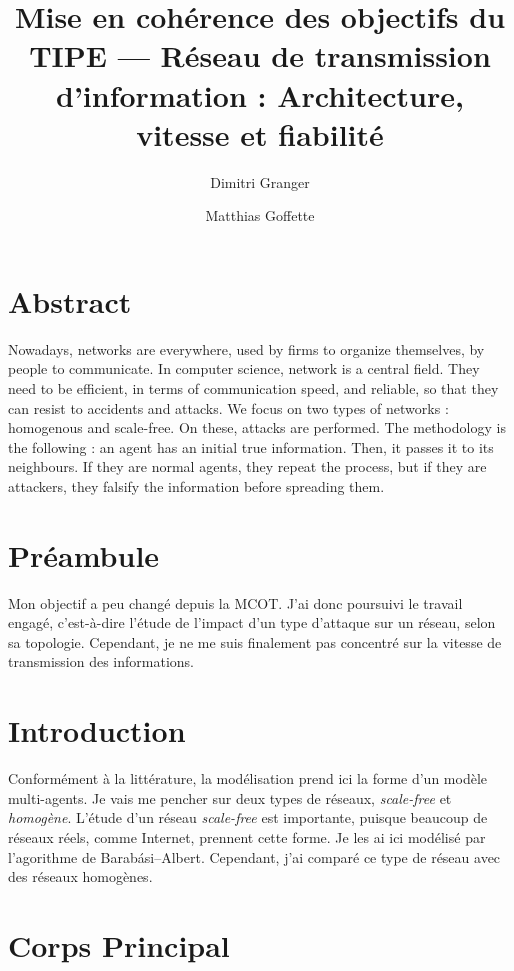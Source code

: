 \documentclass[11pt,a4paper]{article}
\title{Mise en cohérence des objectifs du TIPE --- Réseau de transmission d'information : Architecture, vitesse et fiabilité}
\author{Dimitri Granger \and Matthias Goffette}
\begin{document}
\maketitle

\section{Abstract} %

	Nowadays, networks are everywhere, used by firms to organize themselves, by people to communicate. In computer science, network is a central field. They need to be efficient, in terms of communication speed, and reliable, so that they can resist to accidents and attacks. We focus on two types of networks : homogenous and scale-free. On these, attacks are performed. The methodology is the following : an agent has an initial true information. Then, it passes it to its neighbours. If they are normal agents, they repeat the process, but if they are attackers, they falsify the information before spreading them. 



\section{Préambule} %

	Mon objectif a peu changé depuis la MCOT. J'ai donc poursuivi le travail engagé, c'est-à-dire l'étude de l'impact d'un type d'attaque sur un réseau, selon sa topologie. Cependant, je ne me suis finalement pas concentré sur la vitesse de transmission des informations.

\section{Introduction} %

	Conformément à la littérature, la modélisation prend ici la forme d'un modèle multi-agents. Je vais me pencher sur deux types de réseaux, \emph{scale-free} et \emph{homogène}. L'étude d'un réseau \emph{scale-free} est importante, puisque beaucoup de réseaux réels, comme Internet, prennent cette forme. Je les ai ici modélisé par l'agorithme de Barabási–Albert. Cependant, j'ai comparé ce type de réseau avec des réseaux homogènes.

\section{Corps Principal} %
\end{document}
